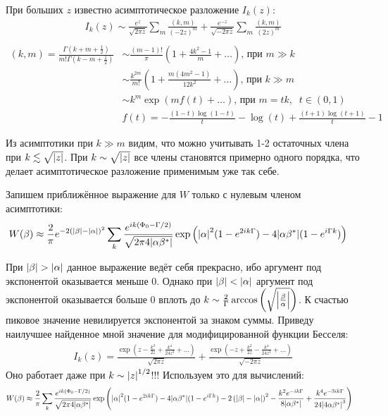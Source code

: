 \documentclass[a4paper, 12pt]{article}
\newenvironment{eqw}{\begin{equation} \begin{aligned}}   
    {\end{aligned}    \end{equation}}
\begin{document}
При больших $z$ известно асимптотическое разложение $I_k(z)$:
\begin{eqw}
     I_k(z) \sim 
     \frac{e^z}{\sqrt{2\pi z}}\sum_m \frac{(k,m)}{(-2z)^m} + \frac{e^{-z}}{\sqrt{-2\pi z}}\sum_m \frac{(k,m)}{(2z)^m}\\
\end{eqw}
\begin{eqw}
    (k, m) = \frac{\Gamma\left(k+m+\frac{1}{2}\right)}{m!\Gamma\left(k-m+\frac{1}{2}\right)} &\sim \frac{(m-1)!}{\pi}\left(1+\frac{4k^2-1}{m}+\dots\right)\text{, при }m\gg k\\
    &\sim \frac{k^{2m}}{m!}\left(1+\frac{m(4m^2-1)}{12k^2}+\dots\right)\text{, при }k\gg m\\
    &\sim k^m \exp\left(m f(t)+\dots \right)\text{, при } m = t k,\;\; t\in(0, 1)\\
    &f(t) = -\frac{(1-t) \log (1-t)}{t}-\log (t)+\frac{(t+1)\log (t+1)}{t}-1
\end{eqw}

Из асимптотики при $k\gg m$ видим, что можно учитывать 1-2 остаточных члена при $k\lesssim \sqrt{\abs{z}}$. При $k\sim\sqrt{\abs{z}}$ все члены становятся примерно одного порядка, что делает асимптотическое разложение применимым уже так себе. 

Запишем приближённое выражение для $W$ только с нулевым членом асимптотики:
\begin{eqw}
     W(\beta) &\approx \frac{2}{\pi}e^{-2\left(\abs{\beta} - \abs{\alpha}\right)^2}
     \sum\limits_k \frac{e^{ik(\Phi_0-\Gamma/2)}}{\sqrt{2\pi 4\abs{\alpha\beta^*}}}
     \exp\left(\abs{\alpha}^2 (1-e^{2ik\Gamma})-4\abs{\alpha\beta^*}(1-e^{i\Gamma k})\right)
\end{eqw}

При $\abs{\beta}>\abs{\alpha}$ данное выражение ведёт себя прекрасно, ибо аргумент под экспонентой оказывается меньше 0. Однако при $\abs{\beta}<\abs{\alpha}$ аргумент под экспонентой оказывается больше 0 вплоть до $k\sim\frac{2}{\Gamma}\arccos\left(\sqrt{\abs{\frac{\beta}{\alpha}}}\right)$. К счастью пиковое значение невилируется экспонентой за знаком суммы. Приведу наилучшее найденное мной значение для модифицированной функции Бесселя:
\begin{eqw}
     I_k(z) = \frac{\exp\left(z-\frac{k^2}{2z}+\frac{k^4}{24z^3}+\dots\right)}{\sqrt{2\pi z}} + \frac{\exp\left(-z+\frac{k^2}{2z}-\frac{k^4}{24z^3}+\dots\right)}{\sqrt{-2\pi z}}
\end{eqw}
Оно работает даже при $k\sim\abs{z}^{1/2}$!!! Используем это для вычислений:
\begin{eqw}
    W(\beta) &\approx \frac{2}{\pi}
    \sum\limits_k \frac{e^{ik(\Phi_0-\Gamma/2)}}{\sqrt{2\pi 4\abs{\alpha\beta^*}}}
    \exp\left(\abs{\alpha}^2 (1-e^{2ik\Gamma})-4\abs{\alpha\beta^*}(1-e^{i\Gamma k})-2\left(\abs{\beta} - \abs{\alpha}\right)^2-
    \frac{k^2 e^{-ik\Gamma}}{8\abs{\alpha\beta^*}}+\frac{k^4 e^{-3ik\Gamma}}{24\abs{4\alpha\beta^*}^3}\right)
\end{eqw}
\end{document}
